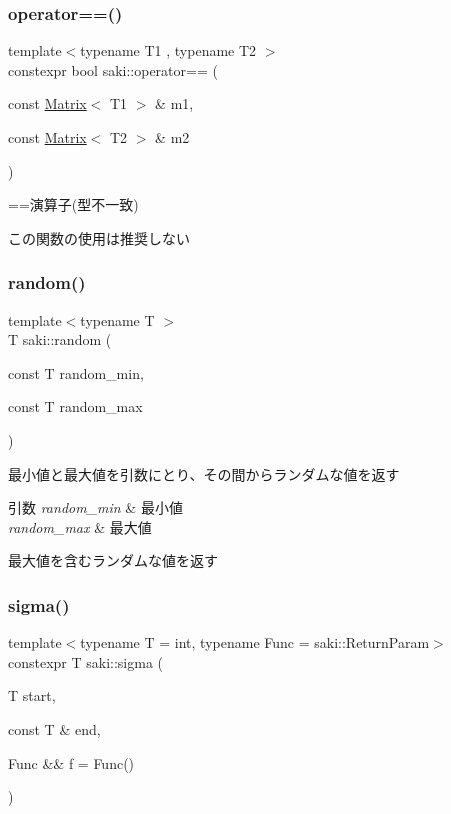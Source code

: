 \subsubsection{\texorpdfstring{operator==()}{operator==()}\hspace{0.1cm}{\footnotesize\ttfamily [10/10]}}
{\footnotesize\ttfamily template$<$typename T1 , typename T2 $>$ \\
constexpr bool saki\+::operator== (\begin{DoxyParamCaption}\item[{const \mbox{\hyperlink{classsaki_1_1_matrix}{Matrix}}$<$ T1 $>$ \&}]{m1,  }\item[{const \mbox{\hyperlink{classsaki_1_1_matrix}{Matrix}}$<$ T2 $>$ \&}]{m2 }\end{DoxyParamCaption})}



==演算子(型不一致) 

この関数の使用は推奨しない \mbox{\label{namespacesaki_a636caf16f2f00cb734cc867646ac233f}} 
\subsubsection{\texorpdfstring{random()}{random()}}
{\footnotesize\ttfamily template$<$typename T $>$ \\
T saki\+::random (\begin{DoxyParamCaption}\item[{const T}]{random\+\_\+min,  }\item[{const T}]{random\+\_\+max }\end{DoxyParamCaption})}



最小値と最大値を引数にとり、その間からランダムな値を返す 


\begin{DoxyParams}{引数}
{\em random\+\_\+min} & 最小値 \\
\hline
{\em random\+\_\+max} & 最大値\\
\hline
\end{DoxyParams}
最大値を含むランダムな値を返す \mbox{\label{namespacesaki_aa5a82a930469f18d700db4d93b59a7e5}} 
\subsubsection{\texorpdfstring{sigma()}{sigma()}}
{\footnotesize\ttfamily template$<$typename T  = int, typename Func  = saki\+::\+Return\+Param$>$ \\
constexpr T saki\+::sigma (\begin{DoxyParamCaption}\item[{T}]{start,  }\item[{const T \&}]{end,  }\item[{Func \&\&}]{f = {\ttfamily Func()} }\end{DoxyParamCaption})}



